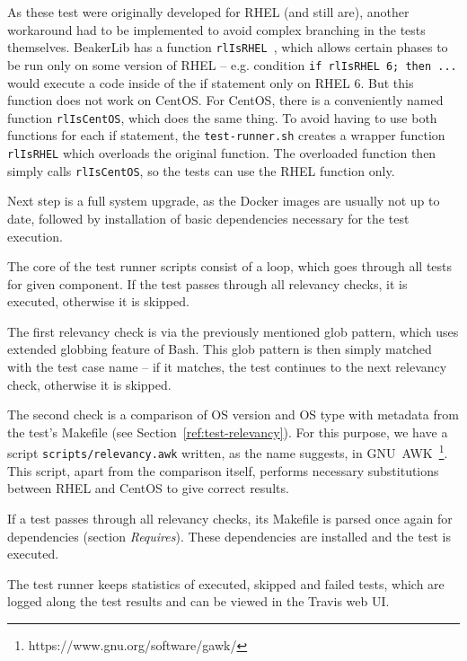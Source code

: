     As these test were originally developed for RHEL (and still are),
    another workaround had to be implemented to avoid complex branching in
    the tests themselves. BeakerLib
    has a function \texttt{rlIsRHEL}~\cite{beakerlib-gh-man}, which allows certain phases to be
    run only on some version of RHEL -- e.g. condition
    \texttt{if rlIsRHEL 6; then ...} would execute a code inside of the if
    statement only on RHEL 6. But this function does not work on CentOS. For
    CentOS, there is a conveniently named function \texttt{rlIsCentOS}, which
    does the same thing. To avoid having to use both functions for each
    if statement, the \texttt{test-runner.sh} creates a wrapper function
    \texttt{rlIsRHEL} which overloads the original function. The overloaded
    function then simply calls \texttt{rlIsCentOS}, so the tests can use
    the RHEL function only.

    Next step is a full system upgrade, as the Docker images are usually not
    up to date, followed by installation of basic dependencies necessary
    for the test execution.

    The core of the test runner scripts consist of a loop, which goes through
    all tests for given component. If the test passes through all relevancy
    checks, it is executed, otherwise it is skipped.

    The first relevancy check is via the previously mentioned glob pattern,
    which uses extended globbing feature of Bash. This glob pattern is then
    simply matched with the test case name -- if it matches, the test continues
    to the next relevancy check, otherwise it is skipped.

    The second check is a comparison of OS version and OS type with metadata
    from the test's Makefile (see Section~\ref{ref:test-relevancy}). For this
    purpose, we have a script \texttt{scripts/relevancy.awk} written, as the
    name suggests, in GNU~AWK~\footnote{https://www.gnu.org/software/gawk/}.
    This script, apart from the comparison itself, performs necessary
    substitutions between RHEL and CentOS to give correct results.

    If a test passes through all relevancy checks, its Makefile is parsed once
    again for dependencies (section \textit{Requires}). These dependencies
    are installed and the test is executed.

    The test runner keeps statistics of executed, skipped and failed tests,
    which are logged along the test results and can be viewed in the Travis
    web UI.

